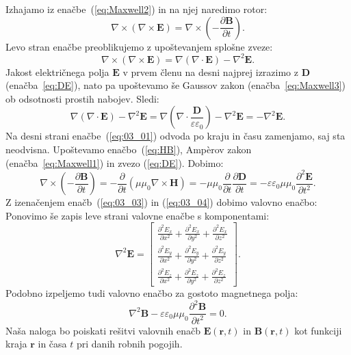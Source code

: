 Izhajamo iz enačbe~(\ref{eq:Maxwell2}) in na njej naredimo rotor:
\begin{equation}
\nabla \times \left(\nabla\times\mathbf{E}\right) =
\nabla \times \left(-\frac{\partial \mathbf{B}}{\partial t} \right)\!\!.
\label{eq:03_01}
\end{equation}
Levo stran enačbe preoblikujemo z upoštevanjem splošne zveze:
\begin{equation}
\nabla \times (\nabla \times \mathbf{E}) = \nabla (\nabla \cdot \mathbf{E}) - \nabla^2 \mathbf{E}.
\label{eq:03_02}
\end{equation}
Jakost električnega polja $\mathbf{E}$  v prvem členu na desni najprej  
izrazimo z $\mathbf{D}$ (enačba~\ref{eq:DE}), nato pa upoštevamo še Gaussov zakon 
(enačba~\ref{eq:Maxwell3}) ob odsotnosti prostih nabojev. Sledi:
\begin{equation}
\nabla (\nabla \cdot \mathbf{E}) - \nabla^2 \mathbf{E} = \nabla \left(\nabla \cdot 
\frac{\mathbf{D}}{\varepsilon \varepsilon_0}\right) - \nabla^2 \mathbf{E} = - \nabla^2 \mathbf{E}.
\label{eq:03_03}
\end{equation}
Na desni strani enačbe~(\ref{eq:03_01}) odvoda po kraju in času zamenjamo, 
saj sta neodvisna. Upoštevamo enačbo~(\ref{eq:HB}), Amp\`{e}rov zakon (enačba~\ref{eq:Maxwell1}) 
in zvezo (\ref{eq:DE}). Dobimo:
\begin{equation}
\nabla \times \left(-\frac{\partial \mathbf{B}}{\partial t} \right) = 
- \frac{\partial}{\partial t}\left(\mu \mu_0 \nabla
\times \mathbf{H}\right) = - \mu \mu_0 \frac{\partial}{\partial t}\frac{\partial \mathbf{D}}{\partial t}
 = -\varepsilon \varepsilon_0 \mu \mu_0 \frac{\partial^2 \mathbf{E}}{\partial t^2}.
\label{eq:03_04}
\end{equation}
Z izenačenjem enačb~(\ref{eq:03_03}) in (\ref{eq:03_04}) dobimo valovno enačbo:
Ponovimo še zapis leve strani valovne enačbe s komponentami:
\begin{equation}
\nabla^2 \mathbf{E} =  
\left[\begin{array}{c}
        \frac{\partial^2E_x}{\partial x^2} + \frac{\partial^2E_x}{\partial y^2} + \frac{\partial^2E_x}{\partial z^2}\\
        \frac{\partial^2E_y}{\partial x^2} + \frac{\partial^2E_y}{\partial y^2} + \frac{\partial^2E_y}{\partial z^2} \\
        \frac{\partial^2E_z}{\partial x^2} + \frac{\partial^2E_z}{\partial y^2} + \frac{\partial^2E_z}{\partial z^2}
      \end{array}\right]\!\!.
\label{eq:03_05}
\end{equation}
Podobno izpeljemo tudi valovno enačbo za gostoto magnetnega polja:
\begin{equation}
\nabla^2\mathbf{B} - \varepsilon \varepsilon_0 \mu \mu_0 \frac{\partial^2 \mathbf{B}}{\partial t^2} = 0.
\label{eq:valovnaB}
\end{equation}
Naša naloga bo poiskati rešitvi valovnih enačb $\mathbf{E}(\mathbf{r},t)$
in $\mathbf{B}(\mathbf{r},t)$ kot funkciji kraja $\mathbf{r}$ in časa $t$ pri danih robnih pogojih.

